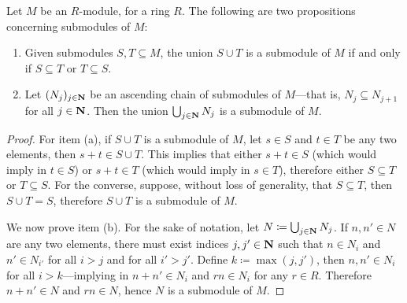 \begin{example}
    \label{exp:union-submodules}
    Let \(M\) be an \(R\)-module, for a ring \(R\). The following are two
    propositions concerning submodules of \(M\):
    \begin{enumerate}\setlength\itemsep{0em}
        \item Given submodules \(S, T \subseteq M\), the union \(S \cup T\) is a
              submodule of \(M\) if and only if \(S \subseteq T\) or \(T \subseteq S\).
        \item Let \((N_j)_{j \in \mathbf{N}}\) be an ascending chain of submodules of
              \(M\)---that is, \(N_j \subseteq N_{j+1}\) for all \(j \in \mathbf{N}\). Then the
              union \(\bigcup_{j \in \mathbf{N}} N_j\) is a submodule of \(M\).
    \end{enumerate}
    \begin{proof}
        For item (a), if \(S \cup T\) is a submodule of \(M\),
        let \(s \in S\) and \(t \in T\) be any two elements, then
        \(s + t \in S \cup T\). This implies that either \(s + t \in S\) (which would
        imply in \(t \in S\)) or \(s + t \in T\) (which would imply in \(s \in T\)),
        therefore either \(S \subseteq T\) or \(T \subseteq S\). For the converse,
        suppose, without loss of generality, that \(S \subseteq T\), then \(S \cup T =
        S\), therefore \(S \cup T\) is a submodule of \(M\).

        We now prove item (b). For the sake of notation, let
        \(N \coloneq \bigcup_{j \in \mathbf{N}} N_j\). If \(n, n' \in N\) are any two elements,
        there must exist indices \(j, j' \in \mathbf{N}\) such that \(n \in N_i\) and
        \(n' \in N_{i'}\) for all \(i > j\) and for all \(i' > j'\). Define
        \(k \coloneq \max(j, j')\), then \(n, n' \in N_i\) for all \(i > k\)---implying
        in \(n + n' \in N_i\) and \(r n \in N_i\) for any \(r \in R\). Therefore
        \(n + n' \in N\) and \(r n \in N\), hence \(N\) is a submodule of \(M\).
    \end{proof}
\end{example}

